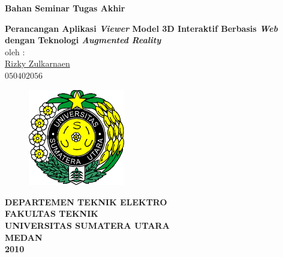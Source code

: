 \documentclass[12pt,a4paper,pdftex,final,oneside,titlepage]{book}
\begin{document}
  

\pagestyle{empty} 
	\begin{titlepage} 
		\begin{center} 
		{\Large\textbf{Bahan Seminar Tugas Akhir}}\\
		\par
		\vspace{2cm}
		\textbf{\Large Perancangan Aplikasi \textit{Viewer} Model 3D Interaktif Berbasis \textit{Web} dengan Teknologi \textit{Augmented Reality}} %
		\vspace{0.5cm} \\
		oleh :\\[0.4cm] 
		{\large\underline{Rizky Zulkarnaen}}\\
		$050402056$ \\%
		\end{center}
		
		\par
		\vfill
		
		\begin{figure}[h]
			\begin{center}
				\includegraphics[width=4.2cm]{./images/logoUSU} %
			\end{center}
        \end{figure}
        
        \vfill 
        
      \begin{center}
      {\bf \large DEPARTEMEN TEKNIK ELEKTRO}\\[0.4cm] 
      {\bf \large FAKULTAS TEKNIK}\\[0.4cm] 
      {\bf \large UNIVERSITAS SUMATERA UTARA}\\[0.4cm] 
      {\bf \large MEDAN}\\[0.4cm] 
      {\bf \large 2010}
      \end{center}
      
   \end{titlepage} 
\end{document}
